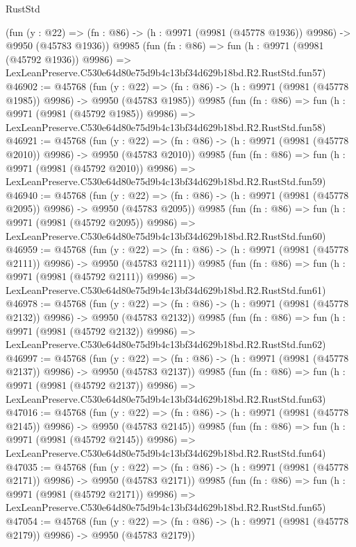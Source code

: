 \begin{lexlean}{RustStd}
\begin{coremodule}
    (fun (y : @22) =>
    (fn : @86) -> (h : @9971 (@9981 (@45778 @1936)) @9986) -> @9950 (@45783 @1936))
    @9985
    (fun (fn : @86) =>
    fun (h : @9971 (@9981 (@45792 @1936)) @9986) =>
    LexLeanPreserve.C530e64d80e75d9b4c13bf34d629b18bd.R2.RustStd.fun57)
@46902 := @45768
    (fun (y : @22) =>
    (fn : @86) -> (h : @9971 (@9981 (@45778 @1985)) @9986) -> @9950 (@45783 @1985))
    @9985
    (fun (fn : @86) =>
    fun (h : @9971 (@9981 (@45792 @1985)) @9986) =>
    LexLeanPreserve.C530e64d80e75d9b4c13bf34d629b18bd.R2.RustStd.fun58)
@46921 := @45768
    (fun (y : @22) =>
    (fn : @86) -> (h : @9971 (@9981 (@45778 @2010)) @9986) -> @9950 (@45783 @2010))
    @9985
    (fun (fn : @86) =>
    fun (h : @9971 (@9981 (@45792 @2010)) @9986) =>
    LexLeanPreserve.C530e64d80e75d9b4c13bf34d629b18bd.R2.RustStd.fun59)
@46940 := @45768
    (fun (y : @22) =>
    (fn : @86) -> (h : @9971 (@9981 (@45778 @2095)) @9986) -> @9950 (@45783 @2095))
    @9985
    (fun (fn : @86) =>
    fun (h : @9971 (@9981 (@45792 @2095)) @9986) =>
    LexLeanPreserve.C530e64d80e75d9b4c13bf34d629b18bd.R2.RustStd.fun60)
@46959 := @45768
    (fun (y : @22) =>
    (fn : @86) -> (h : @9971 (@9981 (@45778 @2111)) @9986) -> @9950 (@45783 @2111))
    @9985
    (fun (fn : @86) =>
    fun (h : @9971 (@9981 (@45792 @2111)) @9986) =>
    LexLeanPreserve.C530e64d80e75d9b4c13bf34d629b18bd.R2.RustStd.fun61)
@46978 := @45768
    (fun (y : @22) =>
    (fn : @86) -> (h : @9971 (@9981 (@45778 @2132)) @9986) -> @9950 (@45783 @2132))
    @9985
    (fun (fn : @86) =>
    fun (h : @9971 (@9981 (@45792 @2132)) @9986) =>
    LexLeanPreserve.C530e64d80e75d9b4c13bf34d629b18bd.R2.RustStd.fun62)
@46997 := @45768
    (fun (y : @22) =>
    (fn : @86) -> (h : @9971 (@9981 (@45778 @2137)) @9986) -> @9950 (@45783 @2137))
    @9985
    (fun (fn : @86) =>
    fun (h : @9971 (@9981 (@45792 @2137)) @9986) =>
    LexLeanPreserve.C530e64d80e75d9b4c13bf34d629b18bd.R2.RustStd.fun63)
@47016 := @45768
    (fun (y : @22) =>
    (fn : @86) -> (h : @9971 (@9981 (@45778 @2145)) @9986) -> @9950 (@45783 @2145))
    @9985
    (fun (fn : @86) =>
    fun (h : @9971 (@9981 (@45792 @2145)) @9986) =>
    LexLeanPreserve.C530e64d80e75d9b4c13bf34d629b18bd.R2.RustStd.fun64)
@47035 := @45768
    (fun (y : @22) =>
    (fn : @86) -> (h : @9971 (@9981 (@45778 @2171)) @9986) -> @9950 (@45783 @2171))
    @9985
    (fun (fn : @86) =>
    fun (h : @9971 (@9981 (@45792 @2171)) @9986) =>
    LexLeanPreserve.C530e64d80e75d9b4c13bf34d629b18bd.R2.RustStd.fun65)
@47054 := @45768
    (fun (y : @22) =>
    (fn : @86) -> (h : @9971 (@9981 (@45778 @2179)) @9986) -> @9950 (@45783 @2179))

\end{coremodule}
\end{lexlean}
